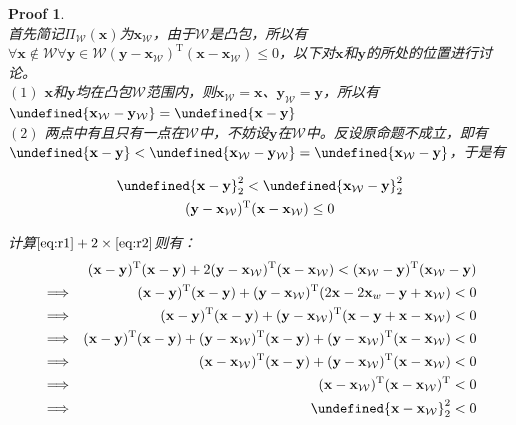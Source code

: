\documentclass[a4paper,UTF8]{article}
\let\norm\undefined %
\DeclarePairedDelimiter\norm{\lVert}{\rVert}
\numberwithin{equation}{section}
\newtheorem*{myProof}{Proof}
\begin{document}
\begin{myProof}~\\
首先简记$\Pi_{\mathcal{W}}(\mathbf{x})$为$\mathbf{x}_\mathcal{W}$，由于$\mathcal{W}$是凸包，所以有$\forall \mathbf{x} \notin \mathcal{W} \forall \mathbf{y} \in \mathcal{W}  (\mathbf{y} - \mathbf{x}_\mathcal{W})^\mathrm{T}(\mathbf{x}-\mathbf{x}_\mathcal{W}) \le 0 $，以下对$\mathbf{x}$和$\mathbf{y}$的所处的位置进行讨论。
~\\
$(1)$ $\mathbf{x}$和$\mathbf{y}$均在凸包$\mathcal{W}$范围内，则$\mathbf{x}_\mathcal{W} = \mathbf{x}$、$\mathbf{y}_\mathcal{W} = \mathbf{y}$，所以有 $\norm{\mathbf{x}_\mathcal{W}-\mathbf{y}_\mathcal{W}} = \norm{\mathbf{x} - \mathbf{y}}$
~\\
$(2)$ 两点中有且只有一点在$\mathcal{W}$中，不妨设$\mathbf{y}$在$\mathcal{W}$中。反设原命题不成立，即有$\norm{\mathbf{x} - \mathbf{y}} < \norm{\mathbf{x}_\mathcal{W} - \mathbf{y}_\mathcal{W}} = \norm{\mathbf{x}_\mathcal{W} - \mathbf{y}}$，于是有

\begin{gather}
\norm{\mathbf{x} - \mathbf{y}}_2^2 < \norm{\mathbf{x}_\mathcal{W} - \mathbf{y}}_2^2 \label{eq:r1} \\
(\mathbf{y}-\mathbf{x}_\mathcal{W})^\mathrm{T}(\mathbf{x} - \mathbf{x}_\mathcal{W}) \le 0  \label{eq:r2}
\end{gather}

计算$\ref{eq:r1} + 2 \times \ref{eq:r2}$则有：
\begin{eqnarray*}
&& (\mathbf{x}-\mathbf{y})^\mathrm{T}(\mathbf{x}-\mathbf{y}) + 2(\mathbf{y} - \mathbf{x}_\mathcal{W})^\mathrm{T}(\mathbf{x}-\mathbf{x}_\mathcal{W}) < (\mathbf{x}_\mathcal{W} - \mathbf{y})^\mathrm{T}(\mathbf{x}_\mathcal{W} - \mathbf{y}) \\
&\Longrightarrow& 
(\mathbf{x}-\mathbf{y})^\mathrm{T}(\mathbf{x}-\mathbf{y}) + (\mathbf{y} - \mathbf{x}_\mathcal{W})^\mathrm{T}(2\mathbf{x} - 2\mathbf{x}_w - \mathbf{y} + \mathbf{x}_\mathcal{W}) < 0 \\
&\Longrightarrow&
(\mathbf{x}-\mathbf{y})^\mathrm{T}(\mathbf{x}-\mathbf{y}) + (\mathbf{y} - \mathbf{x}_\mathcal{W})^\mathrm{T}(\mathbf{x} - \mathbf{y} + \mathbf{x} - \mathbf{x}_\mathcal{W}) < 0 \\
&\Longrightarrow&
(\mathbf{x}-\mathbf{y})^\mathrm{T}(\mathbf{x}-\mathbf{y}) + (\mathbf{y} - \mathbf{x}_\mathcal{W})^\mathrm{T}(\mathbf{x} - \mathbf{y}) + (\mathbf{y} - \mathbf{x}_\mathcal{W})^\mathrm{T}(\mathbf{x} - \mathbf{x}_\mathcal{W}) < 0 \\
&\Longrightarrow&
(\mathbf{x} - \mathbf{x}_\mathcal{W})^\mathrm{T}(\mathbf{x} - \mathbf{y}) + (\mathbf{y} - \mathbf{x}_\mathcal{W})^\mathrm{T}(\mathbf{x} - \mathbf{x}_\mathcal{W}) < 0 \\
&\Longrightarrow&
(\mathbf{x} - \mathbf{x}_\mathcal{W})^\mathrm{T}(\mathbf{x} - \mathbf{x}_\mathcal{W})^\mathrm{T} < 0 \\
&\Longrightarrow&
\norm{\mathbf{x} - \mathbf{x}_\mathcal{W}}_2^2 < 0
\end{eqnarray*}


\end{myProof}
\end{document}
